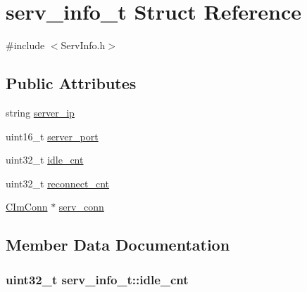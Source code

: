 \hypertarget{structserv__info__t}{}\section{serv\+\_\+info\+\_\+t Struct Reference}
\label{structserv__info__t}


{\ttfamily \#include $<$Serv\+Info.\+h$>$}

\subsection*{Public Attributes}
\begin{DoxyCompactItemize}
\item 
string \hyperlink{structserv__info__t_ac68355b18220ac21aa80a93c1a07ed16}{server\+\_\+ip}
\item 
uint16\+\_\+t \hyperlink{structserv__info__t_a852cb081e2edc1969b7629840b5a2b67}{server\+\_\+port}
\item 
uint32\+\_\+t \hyperlink{structserv__info__t_a22ee8096a6f4de9b00ad764ba9d20518}{idle\+\_\+cnt}
\item 
uint32\+\_\+t \hyperlink{structserv__info__t_ad748792c213ac63b9214a1b6ebd101eb}{reconnect\+\_\+cnt}
\item 
\hyperlink{class_c_im_conn}{C\+Im\+Conn} $\ast$ \hyperlink{structserv__info__t_a312f92c0c183e16f5715f781eb6a5891}{serv\+\_\+conn}
\end{DoxyCompactItemize}


\subsection{Member Data Documentation}
\hypertarget{structserv__info__t_a22ee8096a6f4de9b00ad764ba9d20518}{}
\subsubsection[{idle\+\_\+cnt}]{\setlength{\rightskip}{0pt plus 5cm}uint32\+\_\+t serv\+\_\+info\+\_\+t\+::idle\+\_\+cnt}\label{structserv__info__t_a22ee8096a6f4de9b00ad764ba9d20518}
\hypertarget{structserv__info__t_ad748792c213ac63b9214a1b6ebd101eb}{}

